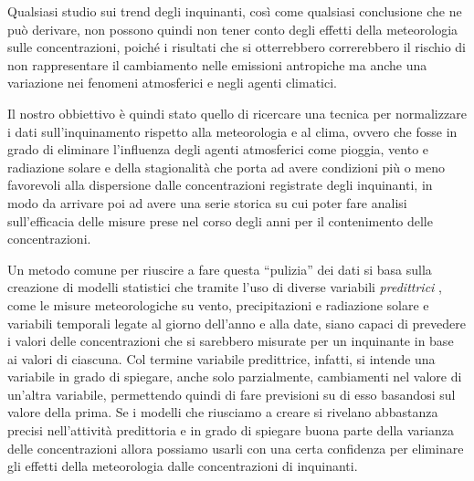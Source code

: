 Qualsiasi studio sui trend degli inquinanti, così come qualsiasi conclusione che ne può derivare, non possono quindi non tener conto degli effetti della meteorologia sulle concentrazioni, poiché i risultati che si otterrebbero correrebbero il rischio di non rappresentare il cambiamento nelle emissioni antropiche ma anche una variazione nei fenomeni atmosferici e negli agenti climatici.  

Il nostro obbiettivo è quindi stato quello di ricercare una tecnica per normalizzare i dati sull'inquinamento rispetto alla meteorologia e al clima, ovvero che fosse in grado di eliminare l'influenza degli agenti atmosferici come pioggia, vento e radiazione solare e della stagionalità che porta ad avere condizioni più o meno favorevoli alla dispersione dalle concentrazioni registrate degli inquinanti, in modo da arrivare poi ad avere una serie storica su cui poter fare analisi sull'efficacia delle misure prese nel corso degli anni per il contenimento delle concentrazioni.  

Un metodo comune per riuscire a fare questa ``pulizia''%
dei dati si basa sulla creazione di modelli statistici che tramite l'uso di diverse variabili \textit{predittrici}
, come le misure meteorologiche su vento, precipitazioni e radiazione solare e variabili temporali legate al giorno dell'anno e alla date, siano capaci di prevedere i valori delle concentrazioni che si sarebbero misurate per un inquinante in base ai valori di ciascuna. Col termine variabile predittrice, infatti, si intende una variabile in grado di spiegare, anche solo parzialmente, cambiamenti nel valore di un'altra variabile, permettendo quindi di fare previsioni su di esso basandosi sul valore della prima. Se i modelli che riusciamo a creare si rivelano abbastanza precisi nell'attività predittoria e in grado di spiegare buona parte della varianza delle concentrazioni allora possiamo usarli con una certa confidenza per eliminare gli effetti della meteorologia dalle concentrazioni di inquinanti.


